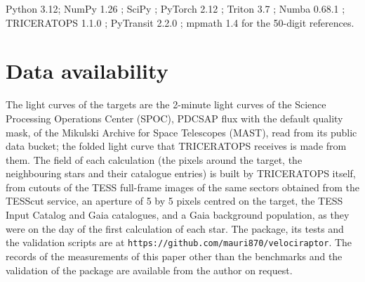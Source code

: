 \documentclass[11pt]{article}
\begin{document}
Python 3.12; NumPy 1.26 \cite{harris2020}; SciPy \cite{virtanen2020}; PyTorch 2.12 \cite{paszke2019}; Triton 3.7 \cite{tillet2019}; Numba 0.68.1 \cite{lam2015}; TRICERATOPS 1.1.0 \cite{giacalone2021,giacalone2020ascl}; PyTransit 2.2.0 \cite{parviainen2015}; mpmath 1.4 \cite{johansson2017} for the 50-digit references.

\section*{Data availability}

The light curves of the targets are the 2-minute light curves of the Science Processing Operations Center (SPOC), PDCSAP flux with the default quality mask, of the Mikulski Archive for Space Telescopes (MAST), read from its public data bucket; the folded light curve that TRICERATOPS receives is made from them. The field of each calculation (the pixels around the target, the neighbouring stars and their catalogue entries) is built by TRICERATOPS itself, from cutouts of the TESS full-frame images of the same sectors obtained from the TESScut service, an aperture of 5 by 5 pixels centred on the target, the TESS Input Catalog and Gaia catalogues, and a Gaia background population, as they were on the day of the first calculation of each star. The package, its tests and the validation scripts are at \texttt{https://github.com/mauri870/velociraptor}. The records of the measurements of this paper other than the benchmarks and the validation of the package are available from the author on request.
\end{document}
